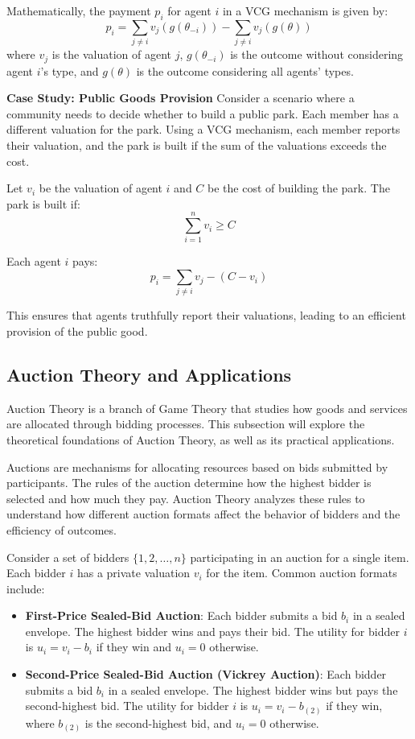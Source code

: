 \documentclass[12pt]{book} %
\begin{document}
Mathematically, the payment $p_i$ for agent $i$ in a VCG mechanism is given by:
\[
p_i = \sum_{j \neq i} v_j(g(\theta_{-i})) - \sum_{j \neq i} v_j(g(\theta))
\]
where $v_j$ is the valuation of agent $j$, $g(\theta_{-i})$ is the outcome without considering agent $i$'s type, and $g(\theta)$ is the outcome considering all agents' types.

\textbf{Case Study: Public Goods Provision}
Consider a scenario where a community needs to decide whether to build a public park. Each member has a different valuation for the park. Using a VCG mechanism, each member reports their valuation, and the park is built if the sum of the valuations exceeds the cost.

Let $v_i$ be the valuation of agent $i$ and $C$ be the cost of building the park. The park is built if:
\[
\sum_{i=1}^n v_i \geq C
\]

Each agent $i$ pays:
\[
p_i = \sum_{j \neq i} v_j - (C - v_i)
\]

This ensures that agents truthfully report their valuations, leading to an efficient provision of the public good.

\subsection{Auction Theory and Applications}
Auction Theory is a branch of Game Theory that studies how goods and services are allocated through bidding processes. This subsection will explore the theoretical foundations of Auction Theory, as well as its practical applications.

Auctions are mechanisms for allocating resources based on bids submitted by participants. The rules of the auction determine how the highest bidder is selected and how much they pay. Auction Theory analyzes these rules to understand how different auction formats affect the behavior of bidders and the efficiency of outcomes.

Consider a set of bidders $\{1, 2, \ldots, n\}$ participating in an auction for a single item. Each bidder $i$ has a private valuation $v_i$ for the item. Common auction formats include:

\begin{itemize}
    \item \textbf{First-Price Sealed-Bid Auction}: Each bidder submits a bid $b_i$ in a sealed envelope. The highest bidder wins and pays their bid. The utility for bidder $i$ is $u_i = v_i - b_i$ if they win and $u_i = 0$ otherwise.
    \item \textbf{Second-Price Sealed-Bid Auction (Vickrey Auction)}: Each bidder submits a bid $b_i$ in a sealed envelope. The highest bidder wins but pays the second-highest bid. The utility for bidder $i$ is $u_i = v_i - b_{(2)}$ if they win, where $b_{(2)}$ is the second-highest bid, and $u_i = 0$ otherwise.
\end{itemize}
\end{document}
